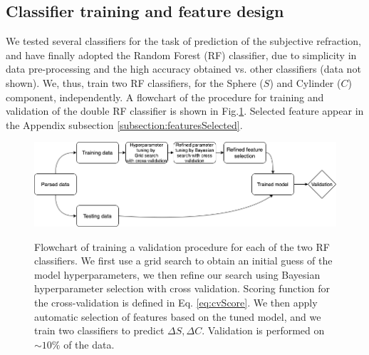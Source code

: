\documentclass[article,twocolumn,preprint,10pt]{paper}%
\renewcommand{\(}{\left(}
\renewcommand{\)}{\right)}
\renewcommand{\[}{\left[}
\renewcommand{\]}{\right]}
\newcommand{\1}{\mbox{\boldmath$1$}}
\begin{document}
   \subsection{Classifier training and feature design}\label{subsection:trainingAndFeatureDesign}
    We tested several classifiers for the task of prediction of the subjective refraction, and have finally adopted the Random Forest (RF) classifier, due to simplicity in data pre-processing and the high accuracy obtained vs. other classifiers (data not shown). We, thus, train two RF classifiers, for the Sphere ($S$) and Cylinder ($C$) component, independently.
	A flowchart of the procedure for training and validation of the double RF classifier is shown in Fig.\ref{fig:trainvalidationflowautoref}. Selected feature appear in the Appendix subsection \ref{subsection:featuresSelected}.
	\begin{figure}
		\centering
		\includegraphics[width=1\linewidth]{training_validation}
		\label{fig:trainvalidationflowautoref}
		\caption{Flowchart of training a validation procedure for each of the two RF classifiers. We first use a grid search to obtain an initial guess of the model hyperparameters, we then refine our search using Bayesian hyperparameter selection with cross validation. Scoring function for the cross-validation is defined in Eq. \ref{eq:cvScore}. We then apply automatic selection of features based on the tuned model, and we train two classifiers to predict $\Delta S,\Delta C$. Validation is performed on $\sim10\%$ of the data.}
	\end{figure}
\end{document}
